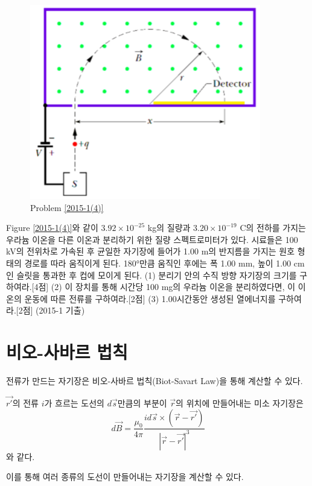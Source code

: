 \begin{problem}\label{2015-1(4)}
\begin{figure}[h]
\centering\includegraphics[scale=0.5]{Pictures/2015-1(4).PNG}
\caption{Problem \ref{2015-1(4)}}
\label{fig:2015-1(4)} %
\end{figure}
Figure \ref{2015-1(4)}와 같이 $3.92\times 10^{-25}$ kg의 질량과 $3.20\times 10^{-19}$ C의 전하를 가지는 우라늄 이온을 다른 이온과 분리하기 위한 질량 스펙트로미터가 있다. 시료들은 100 kV의 전위차로 가속된 후 균일한 자기장에 들어가 1.00 m의 반지름을 가지는 원호 형태의 경로를 따라 움직이게 된다. 180°만큼 움직인 후에는 폭 1.00 mm, 높이 1.00 cm인 슬릿을 통과한 후 컵에 모이게 된다. (1) 분리기 안의 수직 방향 자기장의 크기를 구하여라.[4점] (2) 이 장치를 통해 시간당 100 mg의 우라늄 이온을 분리하였다면, 이 이온의 운동에 따른 전류를 구하여라.[2점] (3) 1.00시간동안 생성된 열에너지를 구하여라.[2점]
(2015-1 기출)
\end{problem}

\section{비오-사바르 법칙}
전류가 만드는 자기장은 비오-사바르 법칙(Biot-Savart Law)을 통해 계산할 수 있다.
\begin{theorem}[비오-사바르 법칙]
$\vec{r'}$의 전류 $i$가 흐르는 도선의 $d\vec{s}$만큼의 부분이 $\vec{r}$의 위치에 만들어내는 미소 자기장은
\begin{equation}
d\vec{B} = \frac{\mu_0}{4\pi}\frac{id\vec{s}\times (\vec{r}-\vec{r'})}{|\vec{r}-\vec{r'}|^3}
\end{equation}와 같다.
\end{theorem}
이를 통해 여러 종류의 도선이 만들어내는 자기장을 계산할 수 있다.

